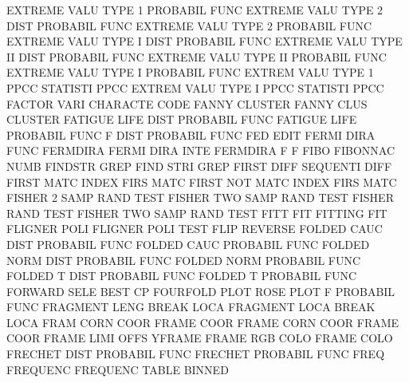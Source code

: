 EXTREME  VALU TYPE 1                    PROBABIL FUNC
EXTREME  VALU TYPE 2    DIST            PROBABIL FUNC
EXTREME  VALU TYPE 2                    PROBABIL FUNC
EXTREME  VALU TYPE I    DIST            PROBABIL FUNC
EXTREME  VALU TYPE II   DIST            PROBABIL FUNC
EXTREME  VALU TYPE II                   PROBABIL FUNC
EXTREME  VALU TYPE I                    PROBABIL FUNC
EXTREM   VALU TYPE 1    PPCC            STATISTI PPCC
EXTREM   VALU TYPE I    PPCC            STATISTI PPCC
FACTOR   VARI                           CHARACTE CODE
FANNY                                   CLUSTER
FANNY    CLUS                           CLUSTER
FATIGUE  LIFE DIST                      PROBABIL FUNC
FATIGUE  LIFE                           PROBABIL FUNC
F        DIST                           PROBABIL FUNC
FED                                     EDIT
FERMI    DIRA FUNC                      FERMDIRA
FERMI    DIRA INTE                      FERMDIRA
F                                       F
FIBO                                    FIBONNAC NUMB
FINDSTR                                 GREP
FIND     STRI                           GREP
FIRST    DIFF                           SEQUENTI DIFF
FIRST    MATC                           INDEX    FIRS MATC
FIRST    NOT  MATC                      INDEX    FIRS MATC
FISHER   2    SAMP RAND TEST            FISHER   TWO  SAMP RAND TEST
FISHER   RAND TEST                      FISHER   TWO  SAMP RAND TEST
FITT                                    FIT
FITTING                                 FIT
FLIGNER  POLI                           FLIGNER  POLI TEST
FLIP                                    REVERSE
FOLDED   CAUC DIST                      PROBABIL FUNC
FOLDED   CAUC                           PROBABIL FUNC
FOLDED   NORM DIST                      PROBABIL FUNC
FOLDED   NORM                           PROBABIL FUNC
FOLDED   T    DIST                      PROBABIL FUNC
FOLDED   T                              PROBABIL FUNC
FORWARD  SELE                           BEST     CP
FOURFOLD PLOT                           ROSE     PLOT
F                                       PROBABIL FUNC
FRAGMENT LENG                           BREAK    LOCA
FRAGMENT LOCA                           BREAK    LOCA
FRAM     CORN COOR                      FRAME    COOR
FRAME    CORN COOR                      FRAME    COOR
FRAME    LIMI OFFS                      YFRAME
FRAME    RGB  COLO                      FRAME    COLO
FRECHET  DIST                           PROBABIL FUNC
FRECHET                                 PROBABIL FUNC
FREQ                                    FREQUENC
FREQUENC TABLE                          BINNED
